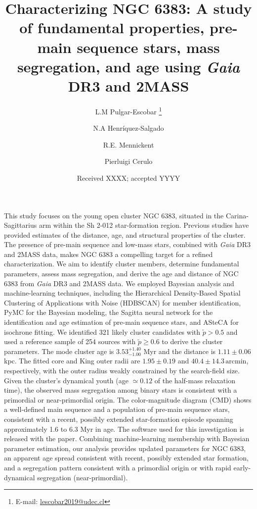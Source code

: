 \documentclass{aa}
\begin{document}
   \title{Characterizing NGC 6383: A study of fundamental properties, pre-main sequence stars, mass segregation, and age using \textit{Gaia} DR3 and 2MASS}

   \author{L.M Pulgar-Escobar
          \thanks{E-mail: \href{mailto:lescobar2019@udec.cl}{lescobar2019@udec.cl}}
          \and
        N.A Henríquez-Salgado
        \and 
        R.E. Mennickent
        \and
        Pierluigi Cerulo
          }


   \date{Received XXXX; accepted YYYY}

  \abstract
   {This study focuses on the young open cluster NGC 6383, situated in the Carina-Sagittarius arm within the Sh 2-012 star-formation region. Previous studies have provided estimates of the distance, age, and structural properties of the cluster. The presence of pre-main sequence and low-mass stars, combined with \textit{Gaia} DR3 and 2MASS data, makes NGC 6383 a compelling target for a refined characterization.}
   {We aim to identify cluster members, determine fundamental parameters, assess mass segregation, and derive the age and distance of NGC 6383 from \textit{Gaia} DR3 and 2MASS data.}
   {We employed Bayesian analysis and machine-learning techniques, including the Hierarchical Density-Based Spatial Clustering of Applications with Noise (HDBSCAN) for member identification, PyMC for the Bayesian modeling, the Sagitta neural network for the identification and age estimation of pre-main sequence stars, and ASteCA for isochrone fitting.}   
   {We identified 321 likely cluster candidates with $\tilde{p}>0.5$ and used a reference sample of 254 sources with $\tilde{p}\geq0.6$ to derive the cluster parameters. The mode cluster age is $3.53^{+1.40}_{-1.00}$ Myr and the distance is $1.11\pm 0.06$ kpc. The fitted core and King outer radii are $1.95 \pm 0.19$ and $40.4 \pm 14.3\,\mathrm{arcmin}$, respectively, with the outer radius weakly constrained by the search-field size. Given the cluster's dynamical youth (age $\simeq0.12$ of the half-mass relaxation time), the observed mass segregation among binary stars is consistent with a primordial or near-primordial origin. The color-magnitude diagram (CMD) shows a well-defined main sequence and a population of pre-main sequence stars, consistent with a recent, possibly extended star-formation episode spanning approximately 1.6 to 6.3 Myr in age. The software used for this investigation is released with the paper.}
   {Combining machine-learning membership with Bayesian parameter estimation, our analysis provides updated parameters for NGC 6383, an apparent age spread consistent with recent, possibly extended star formation, and a segregation pattern consistent with a primordial origin or with rapid early-dynamical segregation (near-primordial).}
\end{document}
